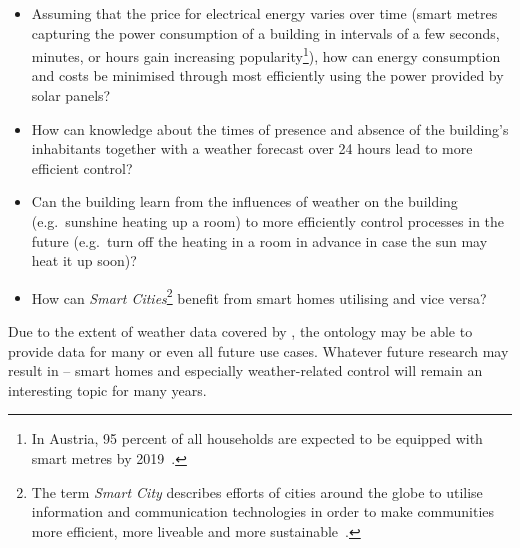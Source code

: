 \begin{itemize}
  \item Assuming that the price for electrical energy varies over time (smart metres capturing the power consumption of a building in intervals of a few seconds, minutes, or hours gain increasing popularity\footnote{In Austria, 95 percent of all households are expected to be equipped with smart metres by 2019~\cite{smart_metres_austria}.}), how can energy consumption and costs be minimised through most efficiently using the power provided by solar panels?
  
  \item How can knowledge about the times of presence and absence of the building's inhabitants together with a weather forecast over 24 hours lead to more efficient  control?
  
  \item Can the building learn from the influences of weather on the building (e.g.\ sunshine heating up a room) to more efficiently control processes in the future (e.g.\ turn off the heating in a room in advance in case the sun may heat it up soon)?
  
  \item How can \emph{Smart Cities}\footnote{The term \emph{Smart City} describes efforts of cities around the globe to utilise information and communication technologies in order to make communities more efficient, more liveable and more sustainable~\cite{smart_city1,smart_city2}.} benefit from smart homes utilising \smarthomeweather and vice versa?
\end{itemize}

Due to the extent of weather data covered by \smarthomeweather, the ontology may be able to provide data for many or even all future use cases. Whatever future research may result in -- smart homes and especially weather-related control will remain an interesting topic for many years.
